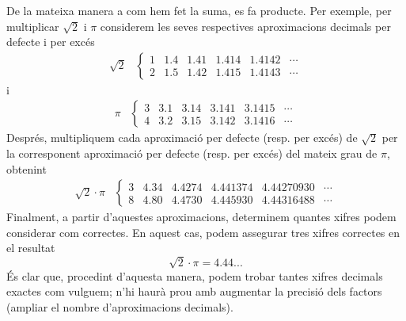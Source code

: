 De la mateixa manera a com hem fet la suma, es fa producte. Per exemple,
per multiplicar $\sqrt{2}$ i $\pi$ considerem les seves respectives
aproximacions decimals per defecte i per excés%
\begin{equation*}
\begin{array}{cc}
\sqrt{2} & \left\{ 
\begin{array}{cccccc}
1 & 1.4 & 1.41 & 1.414 & 1.4142 & \cdots \\ 
2 & 1.5 & 1.42 & 1.415 & 1.4143 & \cdots%
\end{array}%
\right.%
\end{array}%
\end{equation*}%
i%
\begin{equation*}
\begin{array}{cc}
\pi & \left\{ 
\begin{array}{cccccc}
3 & 3.1 & 3.14 & 3.141 & 3.1415 & \cdots \\ 
4 & 3.2 & 3.15 & 3.142 & 3.1416 & \cdots%
\end{array}%
\right.%
\end{array}%
\end{equation*}%
Després, multipliquem cada aproximació per defecte (resp. per excés) de 
$\sqrt{2}$ per la corresponent aproximació per defecte (resp. per
excés) del mateix grau de $\pi $, obtenint%
\begin{equation*}
\begin{array}{cc}
\sqrt{2}\cdot \pi & \left\{ 
\begin{array}{cccccc}
3 & 4.34 & 4.4274 & 4.441374 & 4.44270930 & \cdots \\ 
8 & 4.80 & 4.4730 & 4.445930 & 4.44316488 & \cdots%
\end{array}%
\right.%
\end{array}%
\end{equation*}%
Finalment, a partir d’aquestes aproximacions, determinem quantes
xifres podem considerar com correctes. En aquest cas, podem assegurar
tres xifres correctes en el resultat%
\begin{equation*}
\sqrt{2}\cdot \pi =4.44...
\end{equation*}%
És clar que, procedint d’aquesta manera, podem trobar tantes xifres
decimals exactes com vulguem; n’hi haurà prou amb augmentar la precisió
dels factors (ampliar el nombre d’aproximacions decimals).

